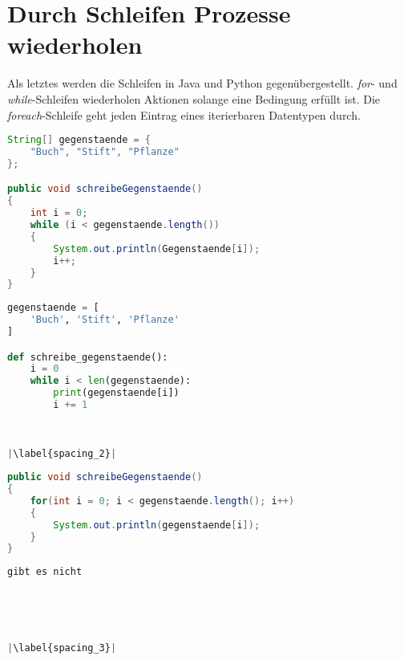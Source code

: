 \section{Durch Schleifen Prozesse wiederholen}
Als letztes werden die Schleifen in Java und Python gegenübergestellt. \textit{for}- und \textit{while}-Schleifen wiederholen Aktionen solange eine Bedingung erfüllt ist. Die \textit{foreach}-Schleife geht jeden Eintrag eines iterierbaren Datentypen durch.

\begin{minipage}{.5\linewidth}
\begin{lstlisting}[language=java,caption={while-Schleife Java},captionpos=b,label={lst:java:while},frame=none]
String[] gegenstaende = {
    "Buch", "Stift", "Pflanze"
};

public void schreibeGegenstaende()
{
    int i = 0;
    while (i < gegenstaende.length())
    {
        System.out.println(Gegenstaende[i]);
        i++;
    }
}
\end{lstlisting}
\end{minipage}
\begin{minipage}{.5\linewidth}
\begin{lstlisting}[language=python,caption={while-Schleife Python},captionpos=b,label={lst:python:while},frame=l,escapechar=|]
gegenstaende = [
    'Buch', 'Stift', 'Pflanze'
]

def schreibe_gegenstaende():
    i = 0
    while i < len(gegenstaende):
        print(gegenstaende[i])
        i += 1
        
        

|\label{spacing_2}|
\end{lstlisting}
\end{minipage}

\begin{minipage}{.5\linewidth}
\begin{lstlisting}[language=java,caption={for-Schleife Java},captionpos=b,label={lst:java:for},frame=none]
public void schreibeGegenstaende()
{
    for(int i = 0; i < gegenstaende.length(); i++)
    {
        System.out.println(gegenstaende[i]);
    }
}
\end{lstlisting}
\end{minipage}
\begin{minipage}{.5\linewidth}
\begin{lstlisting}[language=python,caption={for-Schleife Python},captionpos=b,label={lst:python:for},frame=l,escapechar=|]
gibt es nicht


        
        

|\label{spacing_3}|
\end{lstlisting}
\end{minipage}

